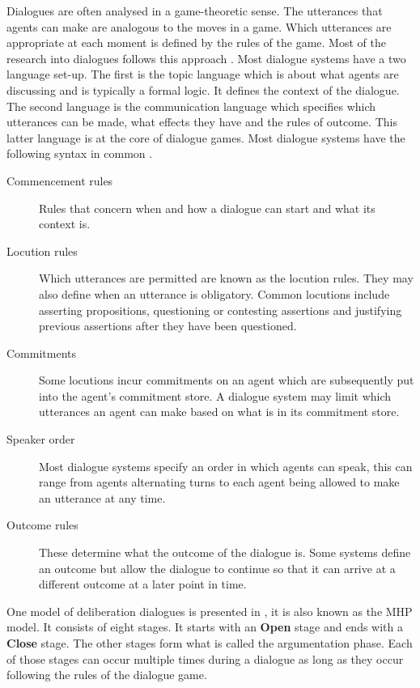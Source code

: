 Dialogues are often analysed in a game-theoretic sense. The utterances
that agents can make are analogous to the moves in a game. Which utterances are
appropriate at each moment is defined by the rules of the game. Most of
the research into dialogues follows this approach
\cite{prakken2006,prakken2009}. Most dialogue systems have a two language
set-up. The first is the topic language which is about what agents are
discussing and is typically a formal logic. It defines the context of the
dialogue. The second language is the communication language which specifies
which utterances can be made, what effects they have and the rules of outcome.
This latter language is at the core of dialogue games. Most dialogue systems
have the following syntax in common \cite{prakken2006,prakken2009,mcburney2009}.
\begin{description}
    \item[Commencement rules] Rules that concern when and how a dialogue can
    start and what its context is.
    \item[Locution rules] Which utterances are permitted are known as the
    locution rules. They may also define when an utterance is obligatory.
    Common locutions include asserting propositions, questioning or contesting
    assertions and justifying previous assertions after they have been
    questioned.
    \item[Commitments] Some locutions incur commitments on an agent which are
    subsequently put into the agent's commitment store. A dialogue system may
    limit which utterances an agent can make based on what is in its commitment
    store.
    \item[Speaker order] Most dialogue systems specify an order in which agents
    can speak, this can range from agents alternating turns to each agent being
    allowed to make an utterance at any time.
    \item[Outcome rules] These determine what the outcome of the dialogue is.
    Some systems define an outcome but allow the dialogue to continue so that 
    it can arrive at a different outcome at a later point in time.
\end{description}
One model of deliberation dialogues is presented in \cite{mcburney2007}, it is
also known as the MHP model. It
consists of eight stages. It starts with an \textbf{Open} stage and ends with
a \textbf{Close} stage. The other stages form what is called the argumentation 
phase. Each of those stages can occur multiple times during a
dialogue as long as they occur following the rules of the dialogue game.
